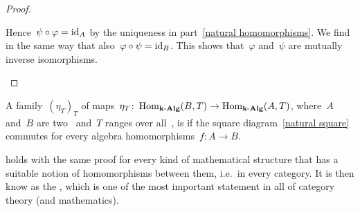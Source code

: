 \begin{proof}
\begin{enumerate}
      Hence~$\psi \circ \varphi = \operatorname{id}_A$ by the uniqueness in part~\ref*{natural homomorphisms}.
      We find in the same way that also~$\varphi \circ \psi = \operatorname{id}_B$.
      This shows that~$\varphi$ and~$\psi$ are mutually inverse isomorphisms.
    \qedhere
  \end{enumerate}
\end{proof}


\begin{definition}
  A family~$(\eta_T)_T$ of maps~$\eta_T \colon \operatorname{Hom}_{\mathbf{k}\text{-}\mathbf{Alg}}(B,T) \to \operatorname{Hom}_{\mathbf{k}\text{-}\mathbf{Alg}}(A,T)$, where~$A$ and~$B$ are two~{\algebras{$\kf$}} and~$T$ ranges over all~{\algebras{$\kf$}}, is  if the square diagram~\eqref{natural square} commutes for every algebra homomorphisms~$f \colon A \to B$.
\end{definition}


\begin{remark}
   holds with the same proof for every kind of mathematical structure that has a suitable notion of homomorphisms between them, i.e.\ in every category.
  It is then know as the , which is one of the most important statement in all of category theory (and mathematics).
\end{remark}












